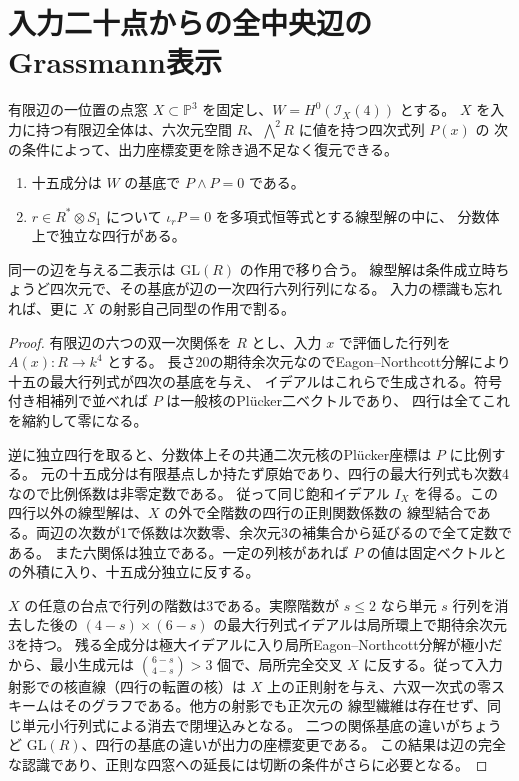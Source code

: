 \section{入力二十点からの全中央辺のGrassmann表示}
\label{sec:edge-plucker-presentations}
\begin{theorem}\label{thm:edge-plucker-presentations}
有限辺の一位置の点窓 $X\subset\mathbb P^3$ を固定し、$W=H^0(\mathcal I_X(4))$ とする。
$X$ を入力に持つ有限辺全体は、六次元空間 $R$、$\bigwedge^2 R$ に値を持つ四次式列 $P(x)$ の
次の条件によって、出力座標変更を除き過不足なく復元できる。
\begin{enumerate}
\item 十五成分は $W$ の基底で $P\wedge P=0$ である。
\item $r\in R^*\otimes S_1$ について $\iota_r P=0$ を多項式恒等式とする線型解の中に、
分数体上で独立な四行がある。
\end{enumerate}
同一の辺を与える二表示は $\mathrm{GL}(R)$ の作用で移り合う。
線型解は条件成立時ちょうど四次元で、その基底が辺の一次四行六列行列になる。
入力の標識も忘れれば、更に $X$ の射影自己同型の作用で割る。
\end{theorem}
\begin{proof}
有限辺の六つの双一次関係を $R$ とし、入力 $x$ で評価した行列を $A(x):R\to k^4$ とする。
長さ20の期待余次元なのでEagon--Northcott分解により十五の最大行列式が四次の基底を与え、
イデアルはこれらで生成される。符号付き相補列で並べれば $P$ は一般核のPlücker二ベクトルであり、
四行は全てこれを縮約して零になる。

逆に独立四行を取ると、分数体上その共通二次元核のPlücker座標は $P$ に比例する。
元の十五成分は有限基点しか持たず原始であり、四行の最大行列式も次数4なので比例係数は非零定数である。
従って同じ飽和イデアル $I_X$ を得る。この四行以外の線型解は、$X$ の外で全階数の四行の正則関数係数の
線型結合である。両辺の次数が1で係数は次数零、余次元3の補集合から延びるので全て定数である。
また六関係は独立である。一定の列核があれば $P$ の値は固定ベクトルとの外積に入り、十五成分独立に反する。

$X$ の任意の台点で行列の階数は3である。実際階数が $s\le2$ なら単元 $s$ 行列を消去した後の
$(4-s)\times(6-s)$ の最大行列式イデアルは局所環上で期待余次元3を持つ。
残る全成分は極大イデアルに入り局所Eagon--Northcott分解が極小だから、最小生成元は
$\binom{6-s}{4-s}>3$ 個で、局所完全交叉 $X$ に反する。従って入力射影での核直線（四行の転置の核）は
$X$ 上の正則射を与え、六双一次式の零スキームはそのグラフである。他方の射影でも正次元の
線型繊維は存在せず、同じ単元小行列式による消去で閉埋込みとなる。
二つの関係基底の違いがちょうど $\mathrm{GL}(R)$、四行の基底の違いが出力の座標変更である。
この結果は辺の完全な認識であり、正則な四窓への延長には切断の条件がさらに必要となる。
\end{proof}

